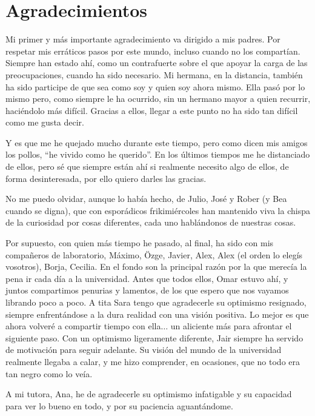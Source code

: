\chapter*{Agradecimientos}

Mi primer y más importante agradecimiento va dirigido a mis padres. Por
respetar mis erráticos pasos por este mundo, incluso cuando no los compartían.
Siempre han estado ahí, como un contrafuerte sobre el que apoyar la carga de las
preocupaciones, cuando ha sido necesario. Mi hermana, en la distancia, también
ha sido participe de que sea como soy y quien soy ahora mismo. Ella pasó por lo
mismo pero, como siempre le ha ocurrido, sin un hermano mayor a quien recurrir,
haciéndolo más difícil. Gracias a ellos, llegar a este punto no ha sido tan
difícil como me gusta decir.

Y es que me he quejado mucho durante este tiempo, pero como dicen mis amigos los
pollos, ``he vivido como he querido''. En los últimos tiempos me he distanciado
de ellos, pero sé que siempre están ahí si realmente necesito algo de ellos, de
forma desinteresada, por ello quiero darles las gracias.

No me puedo olvidar, aunque lo había hecho, de Julio, José y Rober (y Bea cuando
se digna), que con esporádicos frikimiércoles han mantenido viva la chispa de la
curiosidad por cosas diferentes, cada uno hablándonos de nuestras cosas.

Por supuesto, con quien más tiempo he pasado, al final, ha sido con mis
compañeros de laboratorio, Máximo, Özge, Javier, Alex, Alex (el orden lo elegís
vosotros), Borja, Cecilia. En el fondo son la principal razón por la que merecía
la pena ir cada día a la universidad. Antes que todos ellos, Omar estuvo ahí, y
juntos compartimos penurias y lamentos, de los que espero que nos vayamos
librando poco a poco. A tita Sara tengo que agradecerle su optimismo resignado,
siempre enfrentándose a la dura realidad con una visión positiva. Lo mejor es
que ahora volveré a compartir tiempo con ella$\ldots$ un aliciente más para
afrontar el siguiente paso. Con un optimismo ligeramente diferente, Jair siempre
ha servido de motivación para seguir adelante. Su visión del mundo de la
universidad realmente llegaba a calar, y me hizo comprender, en ocasiones, que
no todo era tan negro como lo veía.

A mi tutora, Ana, he de agradecerle su optimismo infatigable y su capacidad para
ver lo bueno en todo, y por su paciencia aguantándome.

